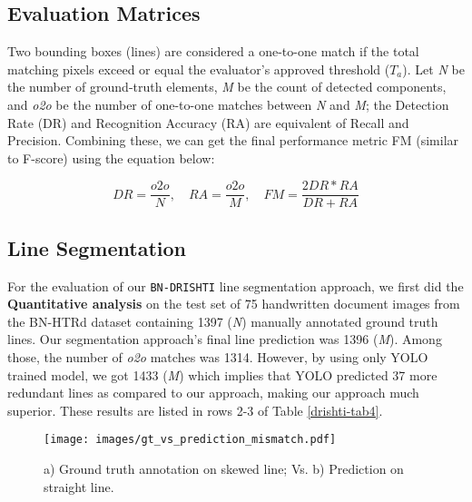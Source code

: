 \documentclass[runningheads]{llncs}
\begin{document}
\vspace{-2mm}
\subsection{Evaluation Matrices}
Two bounding boxes (lines) are considered a one-to-one match if the total matching pixels exceed or equal the evaluator's approved threshold ($T_a$). Let \textit{N} be the number of ground-truth elements, \textit{M} be the count of detected components, and \textit{o2o} be the number of one-to-one matches between \textit{N} and \textit{M}; the Detection Rate (DR) and Recognition Accuracy (RA) are equivalent of Recall and Precision. Combining these, we can get the final performance metric FM (similar to F-score) using the equation below:

\begin{equation} \label{eqn_5_1}
DR = \frac{o2o}{N},\quad RA =\frac{o2o}{M},\quad FM = \frac{2DR*RA}{DR + RA}
\end{equation}

\vspace{-2mm}
\subsection{Line Segmentation}

For the evaluation of our \texttt{BN-DRISHTI} line segmentation approach, we first did the \textbf{Quantitative analysis} on the test set of 75 handwritten document images from the BN-HTRd dataset containing 1397 (\textit{N}) manually annotated ground truth lines. Our segmentation approach's final line prediction was 1396 (\textit{M}). Among those, the number of \textit{o2o} matches was 1314. However, by using only YOLO trained model, we got 1433 (\textit{M}) which implies that YOLO predicted 37 more redundant lines as compared to our approach, making our approach much superior. These results are listed in rows 2-3 of Table \ref{drishti-tab4}.

\begin{figure}[h]
\vspace{-4mm}
    \centering
    \texttt{[image: images/gt\_vs\_prediction\_mismatch.pdf]}
    \vspace{-4mm}
    \caption{a) Ground truth annotation on skewed line; Vs. b) Prediction on straight line.}
    \label{drishti-fig14}
    \vspace{-5mm}
\end{figure}
\end{document}
